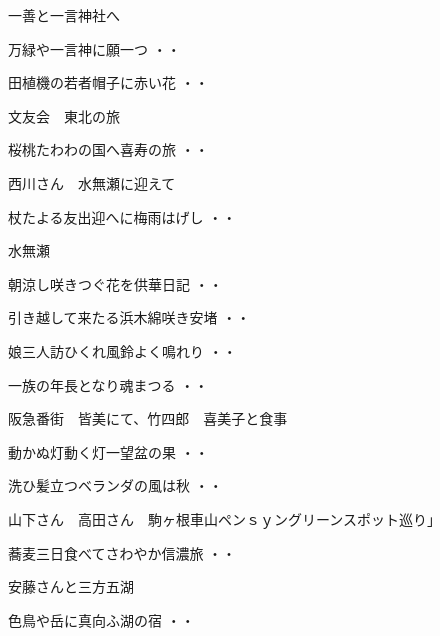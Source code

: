 一善と一言神社へ
\begin{shiika}万緑や一言神に願一つ
\hfill{・・}\end{shiika}
\begin{shiika}田植機の若者帽子に赤い花
\hfill{・・}\end{shiika}
\vspace{0.6cm}
文友会　東北の旅
\begin{shiika}桜桃たわわの国へ喜寿の旅
\hfill{・・}\end{shiika}
\vspace{0.6cm}
西川さん　水無瀬に迎えて
\begin{shiika}杖たよる友出迎へに梅雨はげし
\hfill{・・}\end{shiika}
\vspace{0.6cm}
水無瀬
\begin{shiika}朝涼し咲きつぐ花を供華日記
\hfill{・・}\end{shiika}
\begin{shiika}引き越して来たる浜木綿咲き安堵
\hfill{・・}\end{shiika}
\begin{shiika}娘三人訪ひくれ風鈴よく鳴れり
\hfill{・・}\end{shiika}
\begin{shiika}一族の年長となり魂まつる
\hfill{・・}\end{shiika}
\vspace{0.6cm}
阪急番街　皆美にて、竹四郎　喜美子と食事
\begin{shiika}動かぬ灯動く灯一望盆の果
\hfill{・・}\end{shiika}
\begin{shiika}洗ひ髪立つベランダの風は秋
\hfill{・・}\end{shiika}
\vspace{0.6cm}
山下さん　高田さん　駒ヶ根車山ペンｓｙングリーンスポット巡り」
\begin{shiika}蕎麦三日食べてさわやか信濃旅
\hfill{・・}\end{shiika}
\vspace{0.6cm}
安藤さんと三方五湖
\begin{shiika}色鳥や岳に真向ふ湖の宿
\hfill{・・}\end{shiika}
